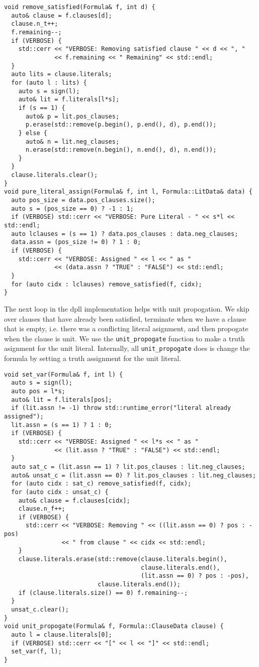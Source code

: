 \documentclass[10pt,AMS Euler]{article}
\begin{document}
\begin{verbatim}
void remove_satisfied(Formula& f, int d) {
  auto& clause = f.clauses[d];
  clause.n_t++;
  f.remaining--;
  if (VERBOSE) {
    std::cerr << "VERBOSE: Removing satisfied clause " << d << ", "
              << f.remaining << " Remaining" << std::endl;
  }
  auto lits = clause.literals;
  for (auto l : lits) {
    auto s = sign(l);
    auto& lit = f.literals[l*s];
    if (s == 1) {
      auto& p = lit.pos_clauses;
      p.erase(std::remove(p.begin(), p.end(), d), p.end());
    } else {
      auto& n = lit.neg_clauses;
      n.erase(std::remove(n.begin(), n.end(), d), n.end());
    }
  }
  clause.literals.clear();
}
void pure_literal_assign(Formula& f, int l, Formula::LitData& data) {
  auto pos_size = data.pos_clauses.size();
  auto s = (pos_size == 0) ? -1 : 1;
  if (VERBOSE) std::cerr << "VERBOSE: Pure Literal - " << s*l << std::endl;
  auto lclauses = (s == 1) ? data.pos_clauses : data.neg_clauses;
  data.assn = (pos_size != 0) ? 1 : 0;
  if (VERBOSE) {
    std::cerr << "VERBOSE: Assigned " << l << " as "
              << (data.assn ? "TRUE" : "FALSE") << std::endl;
  }
  for (auto cidx : lclauses) remove_satisfied(f, cidx);
}
\end{verbatim}

The next loop in the dpll implementation helps with unit propogation.
We skip over clauses that have already been satisfied, terminate when we
have a clause that is empty, i.e. there was a conflicting literal asignment,
and then propogate when the clause is unit. We use the \texttt{unit\_propogate} function to
make a truth asignment for the unit literal. Internally, all \texttt{unit\_propogate}
does is change the formula by setting a truth assignment for the unit literal.
\begin{verbatim}
void set_var(Formula& f, int l) {
  auto s = sign(l);
  auto pos = l*s;
  auto& lit = f.literals[pos];
  if (lit.assn != -1) throw std::runtime_error("literal already assigned");
  lit.assn = (s == 1) ? 1 : 0;
  if (VERBOSE) {
    std::cerr << "VERBOSE: Assigned " << l*s << " as "
              << (lit.assn ? "TRUE" : "FALSE") << std::endl;
  }
  auto sat_c = (lit.assn == 1) ? lit.pos_clauses : lit.neg_clauses;
  auto& unsat_c = (lit.assn == 0) ? lit.pos_clauses : lit.neg_clauses;
  for (auto cidx : sat_c) remove_satisfied(f, cidx);
  for (auto cidx : unsat_c) {
    auto& clause = f.clauses[cidx];
    clause.n_f++;
    if (VERBOSE) {
      std::cerr << "VERBOSE: Removing " << ((lit.assn == 0) ? pos : -pos)
                << " from clause " << cidx << std::endl;
    }
    clause.literals.erase(std::remove(clause.literals.begin(),
                                      clause.literals.end(),
                                      (lit.assn == 0) ? pos : -pos),
                          clause.literals.end());
    if (clause.literals.size() == 0) f.remaining--;
  }
  unsat_c.clear();
}
void unit_propogate(Formula& f, Formula::ClauseData clause) {
  auto l = clause.literals[0];
  if (VERBOSE) std::cerr << "[" << l << "]" << std::endl;
  set_var(f, l);
}
\end{verbatim}
\end{document}

